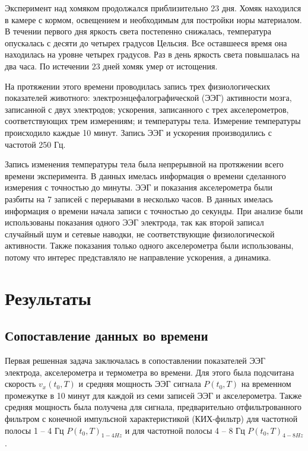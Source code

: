 \documentclass[12pt,a4paper,oneside]{article}
\begin{document}
Эксперимент над хомяком продолжался приблизительно 23 дня. Хомяк находился в камере с кормом, освещением и необходимым для постройки норы материалом. В течении первого дня яркость света постепенно снижалась, температура опускалась с десяти до четырех градусов Цельсия. Все оставшееся время она находилась на уровне четырех градусов. Раз в день яркость света повышалась на два часа. По истечении 23 дней хомяк умер от истощения. 

На протяжении этого времени проводилась запись трех физиологических показателей животного: электроэнцефалографической (ЭЭГ) активности мозга, записанной с двух электродов; ускорения, записанного с трех акселерометров, соответствующих трем измерениям; и температуры тела. Измерение температуры происходило каждые 10 минут. Запись ЭЭГ и ускорения производились с частотой 250 Гц. 

Запись изменения температуры тела была непрерывной на протяжении всего времени эксперимента. В данных имелась информация о времени сделанного измерения с точностью до минуты. ЭЭГ и показания акселерометра были разбиты на 7 записей с перерывами в несколько часов. В данных имелась информация о времени начала записи с точностью до секунды. При анализе были использованы показания одного ЭЭГ электрода, так как второй записал случайный шум и сетевые наводки, не соответствующие физиологической активности. Также показания только одного акселерометра были использованы, потому что интерес представляло не направление ускорения, а динамика. 

\newpage

\section{Результаты} %

\subsection{Сопоставление данных во времени}

Первая решенная задача заключалась в сопоставлении показателей ЭЭГ электрода, акселерометра и термометра во времени. Для этого была подсчитана скорость $v_{x}(t_0, T)$ и средняя мощность ЭЭГ сигнала $P(t_0, T)$ на временном промежутке в 10 минут для каждой из семи записей ЭЭГ и акселерометра. Также средняя мощность была получена для сигнала, предварительно отфильтрованного фильтром с конечной импульсной характеристикой (КИХ-фильтр) для частотной полосы 1 -- 4 Гц $P(t_0, T)_{1-4Hz}$ и для частотной полосы 4 -- 8 Гц $P(t_0, T)_{4-8Hz}$. 
\end{document}
